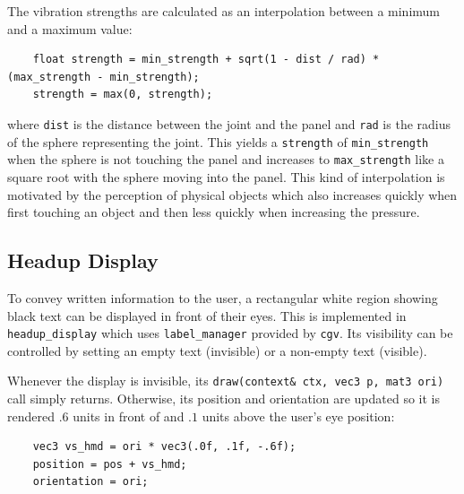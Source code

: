\documentclass[hyperref, bachelorofscience]{cgvpub}
\begin{document}
The vibration strengths are calculated as an interpolation between a minimum and a maximum value:
\vspace{.3cm}
\begin{lstlisting}
	float strength = min_strength + sqrt(1 - dist / rad) * (max_strength - min_strength);
	strength = max(0, strength);
\end{lstlisting}
where \lstinline|dist| is the distance between the joint and the panel and \lstinline|rad| is the radius of the sphere representing the joint. This yields a \lstinline|strength| of \lstinline|min_strength| when the sphere is not touching the panel and increases to \lstinline|max_strength| like a square root with the sphere moving into the panel. This kind of interpolation is motivated by the perception of physical objects which also increases quickly when first touching an object and then less quickly when increasing the pressure. 

\subsection{Headup Display} \label{sec:hd}
To convey written information to the user, a rectangular white region showing black text can be displayed in front of their eyes. This is implemented in \lstinline|headup_display| which uses \lstinline|label_manager| provided by \lstinline|cgv|. Its visibility can be controlled by setting an empty text (invisible) or a non-empty text (visible).

Whenever the display is invisible, its \lstinline|draw(context& ctx, vec3 p, mat3 ori)| call simply returns. Otherwise, its position and orientation are updated so it is rendered $ .6 $ units in front of and $ .1 $ units above the user's eye position:
\begin{lstlisting}
	vec3 vs_hmd = ori * vec3(.0f, .1f, -.6f);
	position = pos + vs_hmd;
	orientation = ori;
\end{lstlisting}
\end{document}
